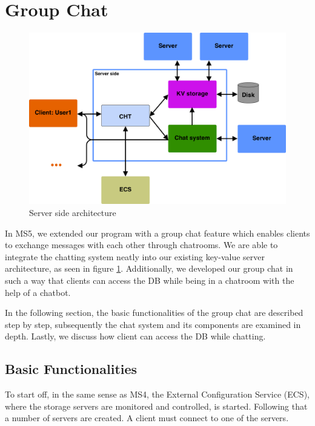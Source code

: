 \section{Group Chat}
\label{sec:groupchat}

\begin{figure}[h]
	\centering
	\includegraphics[width=\linewidth]{figures/chat/chat_full_arch.png}
	\caption{Server side architecture}
	\label{fig:chat_arch}
\end{figure}

In MS5, we extended our program with a group chat feature which enables clients to exchange messages with each other through chatrooms. We are able to integrate the chatting system neatly into our existing key-value server architecture, as seen in figure \ref{fig:chat_arch}. Additionally, we developed our group chat in such a way that clients can access the DB while being in a chatroom with the help of a chatbot.
 
In the following section, the basic functionalities of the group chat are described step by step, subsequently the chat system and its components are examined in depth. Lastly, we discuss how client can access the DB while chatting.

\subsection{Basic Functionalities}
\label{sec:groupchat_functionalities}
To start off, in the same sense as MS4, the External Configuration Service (ECS), where the storage servers are monitored and controlled, is started. Following that a number of servers are created. A client must connect to one of the servers.

